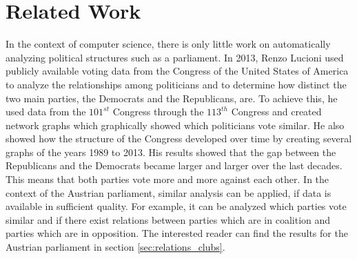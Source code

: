 \chapter{Related Work}
\label{chap:relatedwork}

In the context of computer science, there is only little work on automatically analyzing political structures such as a parliament. In 2013, Renzo Lucioni \cite{Lucioni_2015} used publicly available voting data from the Congress of the United States of America to analyze the relationships among politicians and to determine how distinct the two main parties, the Democrats and the Republicans, are. To achieve this, he used data from the $101^{st}$ Congress through the $113^{th}$ Congress and created network graphs which graphically showed which politicians vote similar. He also showed how the structure of the Congress developed over time by creating several graphs of the years 1989 to 2013. His results showed that the gap between the Republicans and the Democrats became larger and larger over the last decades. This means that both parties vote more and more against each other. In the context of the Austrian parliament, similar analysis can be applied, if data is available in sufficient quality. For example, it can be analyzed which parties vote similar and if there exist relations between parties which are in coalition and parties which are in opposition. The interested reader can find the results for the Austrian parliament in section \ref{sec:relations_clubs}.

